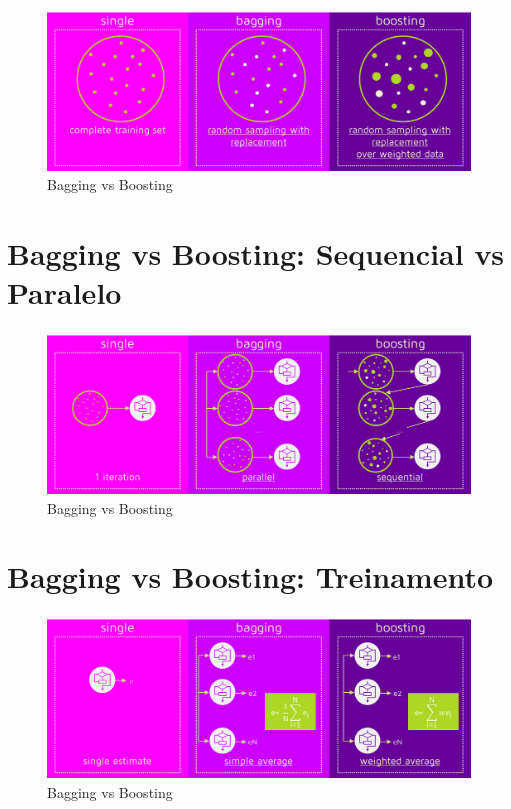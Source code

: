 \documentclass[11pt]{article}
\makeatletter
\def\maxwidth{\ifdim\Gin@nat@width>\linewidth\linewidth
    \else\Gin@nat@width\fi}
\let\Oldincludegraphics\includegraphics
\renewcommand{\includegraphics}[1]{\Oldincludegraphics[width=.8\maxwidth]{#1}}
\makeatother
\begin{document}
\begin{figure}
\centering
\includegraphics{figuras/bagging-boosting-1.png}
\caption{Bagging vs Boosting}
\end{figure}

    \hypertarget{bagging-vs-boosting-sequencial-vs-paralelo}{%
\section{Bagging vs Boosting: Sequencial vs
Paralelo}\label{bagging-vs-boosting-sequencial-vs-paralelo}}

\begin{figure}
\centering
\includegraphics{figuras/bagging-boosting-2.png}
\caption{Bagging vs Boosting}
\end{figure}

    \hypertarget{bagging-vs-boosting-treinamento}{%
\section{Bagging vs Boosting:
Treinamento}\label{bagging-vs-boosting-treinamento}}

\begin{figure}
\centering
\includegraphics{figuras/bagging-boosting-3.png}
\caption{Bagging vs Boosting}
\end{figure}
\end{document}
